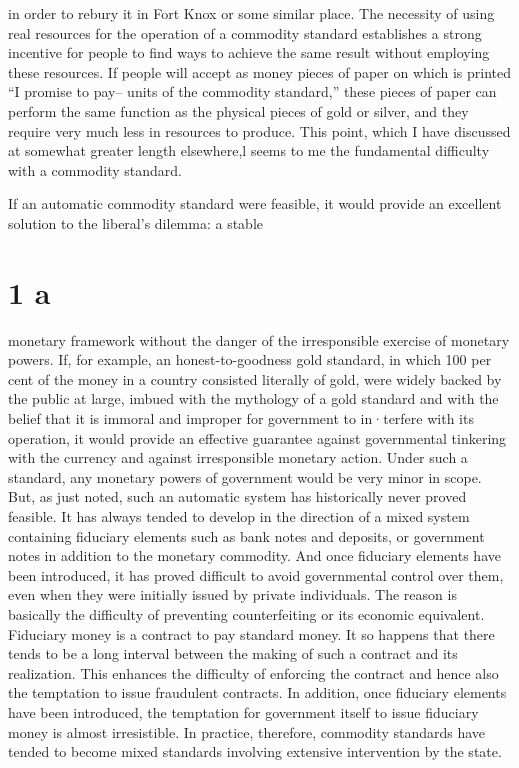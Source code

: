 \documentclass[11pt,openany]{book}
\newcommand{\booksection}[1]{%
  \phantomsection\section*{#1}%
  \addcontentsline{toc}{section}{#1}\markright{#1}}
\begin{document}
in order to rebury it in Fort Knox or some similar place. The necessity of using real resources for the operation of a commodity standard establishes a strong incentive for people to find ways to achieve the same result without employing these resources. If people will accept as money pieces of paper on which is printed ``I promise to pay-- units of the commodity standard,'' these pieces of paper can perform the same function as the physical pieces of gold or silver, and they require very much less in resources to produce. This point, which I have discussed at somewhat greater length elsewhere,l seems to me the fundamental difficulty with a commodity standard.

If an automatic commodity standard were feasible, it would provide an excellent solution to the liberal's dilemma: a stable

\booksection{1 a}

monetary framework without the danger of the irresponsible exercise of monetary powers. If, for example, an honest-to-goodness gold standard, in which 100 per cent of the money in a country consisted literally of gold, were widely backed by the public at large, imbued with the mythology of a gold standard and with the belief that it is immoral and improper for government to in·terfere with its operation, it would provide an effective guarantee against governmental tinkering with the currency and against irresponsible monetary action. Under such a standard, any monetary powers of government would be very minor in scope. But, as just noted, such an automatic system has historically never proved feasible. It has always tended to develop in the direction of a mixed system containing fiduciary elements such as bank notes and deposits, or government notes in addition to the monetary commodity. And once fiduciary elements have been introduced, it has proved difficult to avoid governmental control over them, even when they were initially issued by private individuals. The reason is basically the difficulty of preventing counterfeiting or its economic equivalent. Fiduciary money is a contract to pay standard money. It so happens that there tends to be a long interval between the making of such a contract and its realization. This enhances the difficulty of enforcing the contract and hence also the temptation to issue fraudulent contracts. In addition, once fiduciary elements have been introduced, the temptation for government itself to issue fiduciary money is almost irresistible. In practice, therefore, commodity standards have tended to become mixed standards involving extensive intervention by the state.
\end{document}
